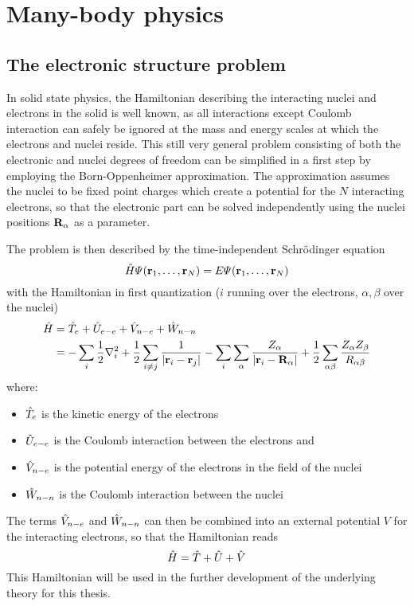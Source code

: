 \documentclass[main.tex]{subfiles}
\begin{document}
\chapter{Many-body physics\label{chap:many-body-physics}}

\section{The electronic structure problem\label{sec:theory_schrödinger}}

In solid state physics, the Hamiltonian describing the interacting nuclei and electrons in the solid is well known, as all interactions except Coulomb interaction can safely be ignored at the mass and energy scales at which the electrons and nuclei reside.
This still very general problem consisting of both the electronic and nuclei degrees of freedom can be simplified in a first step by employing the Born-Oppenheimer approximation.
The approximation assumes the nuclei to be fixed point charges which create a potential for the \(N\) interacting electrons, so that the electronic part can be solved independently using the nuclei positions \(\vb{R}_{\alpha}\) as a parameter.

The problem is then described by the time-independent Schrödinger equation
\begin{equation}\label{}
    \hat{H} \Psi (\vb{r}_1, \ldots, \vb{r}_N) = E \Psi (\vb{r}_1, \ldots, \vb{r}_N)
\end{equation}
with the Hamiltonian in first quantization (\(i\) running over the electrons, \(\alpha, \beta\) over the nuclei)
\begin{align}
    \hat{H} &= \hat{T}_e + \hat{U}_{e-e} + \hat{V}_{n-e} + \hat{W}_{n-n} \\
    &= -\sum_i \frac{1}{2} \nabla^2_i 
    + \frac{1}{2} \sum_{i \neq j} \frac{1}{\vert \vb{r}_i - \vb{r}_j \vert} 
    - \sum_i \sum_{\alpha} \frac{Z_{\alpha}}{\vert \vb{r}_i 
    - \vb{R}_{\alpha} \vert} 
    + \frac{1}{2} \sum_{\alpha \beta} \frac{Z_{\alpha} Z_{\beta}}{R_{\alpha \beta}} 
\end{align}
where:
\begin{itemize}
    \item \(\hat{T}_e\) is the kinetic energy of the electrons
    \item \(\hat{U}_{e-e}\) is the Coulomb interaction between the electrons and
    \item \(\hat{V}_{n-e}\) is the potential energy of the electrons in the field of the nuclei
    \item \(\hat{W}_{n-n}\) is the Coulomb interaction between the nuclei
\end{itemize}
The terms \(\hat{V}_{n-e}\) and \(\hat{W}_{n-n}\) can then be combined into an external potential \(V\) for the interacting electrons, so that the Hamiltonian reads
\begin{equation}\label{eq:solid_state_hamiltonian}
    \hat{H} = \hat{T} + \hat{U} + \hat{V}
\end{equation}
This Hamiltonian will be used in the further development of the underlying theory for this thesis.
\end{document}
